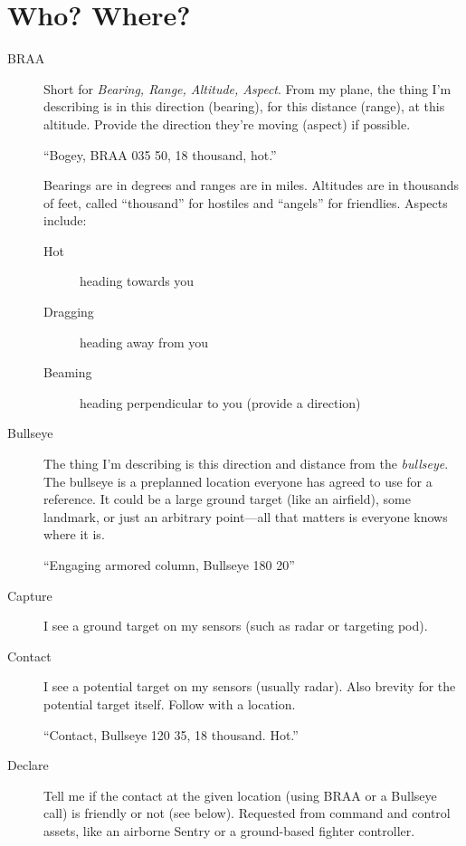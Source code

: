 \section{Who? Where?}

\begin{description}
\item[BRAA] Short for \emph{Bearing, Range, Altitude, Aspect}.
    From my plane, the thing I'm describing is in this direction
    (bearing), for this distance (range), at this altitude.
    Provide the direction they're moving (aspect) if possible.

    ``Bogey, BRAA 035 50, 18 thousand, hot.''

    Bearings are in degrees and ranges are in miles.
    Altitudes are in thousands of feet, called ``thousand'' for hostiles
    and ``angels'' for friendlies. Aspects include:
    \begin{description}
    \item[Hot] heading towards you
    \item[Dragging] heading away from you
    \item[Beaming] heading perpendicular to you (provide a direction)
    \end{description}

\item[Bullseye] The thing I'm describing is this direction and distance
    from the \emph{bullseye}.
    The bullseye is a preplanned location everyone has agreed to use for
    a reference. It could be a large ground target (like an airfield),
    some landmark, or just an arbitrary point---all that matters is
    everyone knows where it is.

    ``Engaging armored column, Bullseye 180 20''

\item[Capture] I see a ground target on my sensors (such as radar
    or targeting pod).

\item[Contact] I see a potential target on my sensors (usually radar).
    Also brevity for the potential target itself.
    Follow with a location.

    ``Contact, Bullseye 120 35, 18 thousand. Hot.''

\item[Declare] Tell me if the contact at the given location
    (using BRAA or a Bullseye call) is friendly or not (see below).
    Requested from command and control  assets,
    like an airborne  Sentry
    or a ground-based fighter controller.


\end{description}
